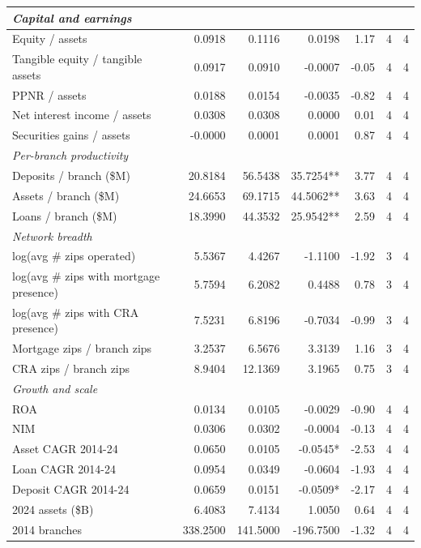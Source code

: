 \begin{tabular}{lrrrrrr}
\midrule
\multicolumn{7}{l}{\emph{Capital and earnings}} \\
\midrule
Equity / assets & 0.0918 & 0.1116 & 0.0198 & 1.17 & 4 & 4 \\
Tangible equity / tangible assets & 0.0917 & 0.0910 & -0.0007 & -0.05 & 4 & 4 \\
PPNR / assets & 0.0188 & 0.0154 & -0.0035 & -0.82 & 4 & 4 \\
Net interest income / assets & 0.0308 & 0.0308 & 0.0000 & 0.01 & 4 & 4 \\
Securities gains / assets & -0.0000 & 0.0001 & 0.0001 & 0.87 & 4 & 4 \\
\midrule
\multicolumn{7}{l}{\emph{Per-branch productivity}} \\
\midrule
Deposits / branch (\$M) & 20.8184 & 56.5438 & 35.7254** & 3.77 & 4 & 4 \\
Assets / branch (\$M) & 24.6653 & 69.1715 & 44.5062** & 3.63 & 4 & 4 \\
Loans / branch (\$M) & 18.3990 & 44.3532 & 25.9542** & 2.59 & 4 & 4 \\
\midrule
\multicolumn{7}{l}{\emph{Network breadth}} \\
\midrule
log(avg \# zips operated) & 5.5367 & 4.4267 & -1.1100 & -1.92 & 3 & 4 \\
log(avg \# zips with mortgage presence) & 5.7594 & 6.2082 & 0.4488 & 0.78 & 3 & 4 \\
log(avg \# zips with CRA presence) & 7.5231 & 6.8196 & -0.7034 & -0.99 & 3 & 4 \\
Mortgage zips / branch zips & 3.2537 & 6.5676 & 3.3139 & 1.16 & 3 & 4 \\
CRA zips / branch zips & 8.9404 & 12.1369 & 3.1965 & 0.75 & 3 & 4 \\
\midrule
\multicolumn{7}{l}{\emph{Growth and scale}} \\
\midrule
ROA & 0.0134 & 0.0105 & -0.0029 & -0.90 & 4 & 4 \\
NIM & 0.0306 & 0.0302 & -0.0004 & -0.13 & 4 & 4 \\
Asset CAGR 2014-24 & 0.0650 & 0.0105 & -0.0545* & -2.53 & 4 & 4 \\
Loan CAGR 2014-24 & 0.0954 & 0.0349 & -0.0604 & -1.93 & 4 & 4 \\
Deposit CAGR 2014-24 & 0.0659 & 0.0151 & -0.0509* & -2.17 & 4 & 4 \\
2024 assets (\$B) & 6.4083 & 7.4134 & 1.0050 & 0.64 & 4 & 4 \\
2014 branches & 338.2500 & 141.5000 & -196.7500 & -1.32 & 4 & 4 \\

\end{tabular}
